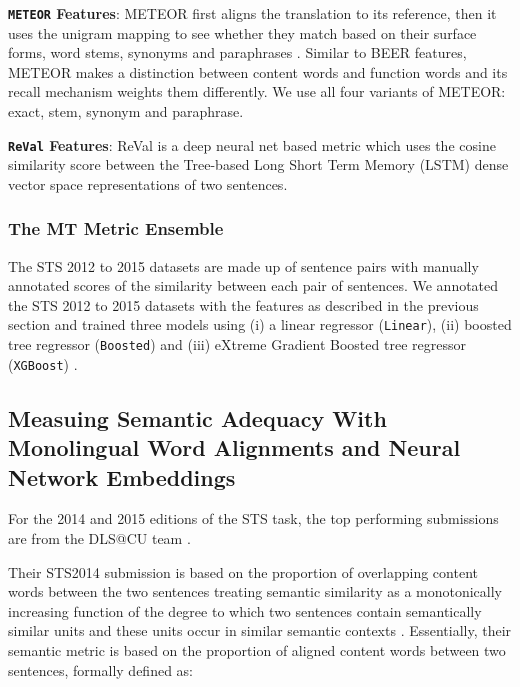 \textbf{{\tt METEOR} Features}: METEOR first aligns the translation to its reference, then it uses the unigram mapping to see whether they match based on their surface forms, word stems, synonyms and paraphrases \citep{Banerjee2005,Denkowski2010}. Similar to BEER features, METEOR makes a distinction between content words and function words and its recall mechanism weights them differently. We use all four variants of METEOR: exact, stem, synonym and paraphrase. 

\textbf{{\tt ReVal} Features}: ReVal \citep{reval2015} is a deep neural net based metric which uses the cosine similarity score between the Tree-based Long Short Term Memory (LSTM) \citep{hochreiter1997long,cho2014,treelstm} dense vector space representations of two sentences.

\subsubsection{The MT Metric Ensemble}

The STS 2012 to 2015 datasets are made up of sentence pairs with manually annotated scores of the similarity between each pair of sentences. We annotated the STS 2012 to 2015 datasets with the features as described in the previous section and trained three models using (i) a linear regressor ({\tt Linear}), (ii) boosted tree regressor ({\tt Boosted}) \citep{friedman2001greedy} and (iii) eXtreme Gradient Boosted tree regressor ({\tt XGBoost}) \citep{chen2015xgboost,chenxgboost}.


\subsection{Measuing Semantic Adequacy With Monolingual Word Alignments and Neural Network Embeddings}

For the 2014 and 2015 editions of the STS task, the top performing submissions are from the DLS@CU team \citep{sultan2014dls,sultan2015dls}. 

Their STS2014 submission is based on the proportion of overlapping content words between the two sentences treating semantic similarity as a monotonically increasing function of the degree to which two sentences contain semantically similar units and these units occur in similar semantic contexts \citep{sultan2014dls}. Essentially, their semantic metric is based on the proportion of aligned content words between two sentences, formally defined as:

